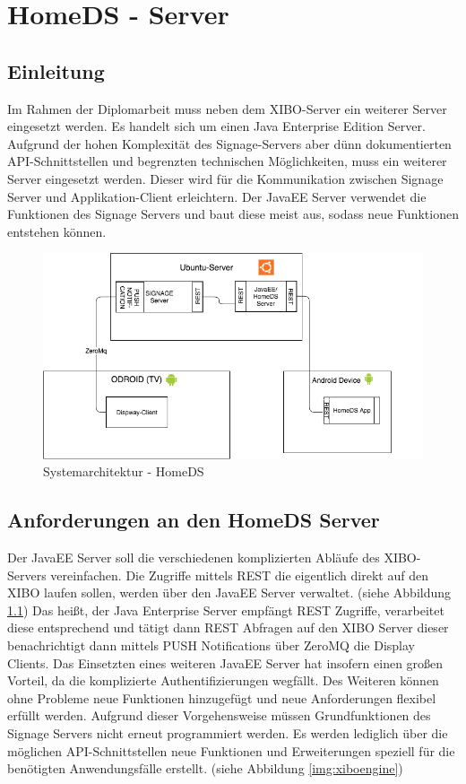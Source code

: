 \chapter{HomeDS - Server}
\section{Einleitung}\label{sec:einleitung}
Im Rahmen der Diplomarbeit muss neben dem XIBO-Server ein weiterer Server eingesetzt werden. Es handelt sich um einen Java Enterprise Edition Server. Aufgrund der hohen Komplexität des Signage-Servers aber dünn dokumentierten API-Schnittstellen und begrenzten technischen Möglichkeiten, muss ein weiterer Server eingesetzt werden. Dieser wird für die Kommunikation zwischen Signage Server und Applikation-Client erleichtern. Der JavaEE Server verwendet die Funktionen des Signage Servers und baut diese meist aus, sodass neue Funktionen entstehen können.

\begin{figure}[H]
\centering
\includegraphics[width=1\textwidth]{images/08_HomeDsWeb/SystemArch.png}
\caption{Systemarchitektur - HomeDS}
\label{img:systemarchitektur}
\end{figure}
 
\section{Anforderungen an den HomeDS Server}\label{sec:homeds}
Der JavaEE Server soll die verschiedenen komplizierten Abläufe des XIBO-Servers vereinfachen. Die Zugriffe mittels REST die eigentlich direkt auf den XIBO laufen sollen, werden über den JavaEE Server verwaltet. (siehe Abbildung \ref{img:systemarchitektur}) Das heißt, der Java Enterprise Server empfängt REST Zugriffe, verarbeitet diese entsprechend und tätigt dann REST Abfragen auf den XIBO Server dieser benachrichtigt dann mittels PUSH Notifications über ZeroMQ die Display Clients. Das Einsetzten eines weiteren JavaEE Server hat insofern einen großen Vorteil, da die komplizierte Authentifizierungen wegfällt. Des Weiteren können ohne Probleme neue Funktionen hinzugefügt und neue Anforderungen flexibel erfüllt werden. Aufgrund dieser Vorgehensweise müssen Grundfunktionen des Signage Servers nicht erneut programmiert werden. Es werden lediglich über die möglichen API-Schnittstellen neue Funktionen und Erweiterungen speziell für die benötigten Anwendungsfälle erstellt. (siehe Abbildung \ref{img:xiboengine})

